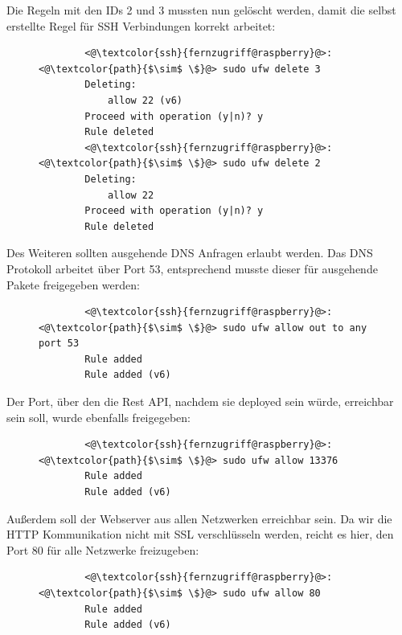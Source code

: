 \documentclass[a4paper, 11pt]{scrartcl}
\begin{document}
Die Regeln mit den IDs 2 und 3 mussten nun gelöscht werden, damit die selbst erstellte Regel für SSH Verbindungen korrekt arbeitet:
\begin{figure}[H]
    \begin{mdframed}[backgroundcolor=bbg]
        \begin{lstlisting}
        <@\textcolor{ssh}{fernzugriff@raspberry}@>:<@\textcolor{path}{$\sim$ \$}@> sudo ufw delete 3
        Deleting:
            allow 22 (v6)
        Proceed with operation (y|n)? y
        Rule deleted
        <@\textcolor{ssh}{fernzugriff@raspberry}@>:<@\textcolor{path}{$\sim$ \$}@> sudo ufw delete 2
        Deleting:
            allow 22
        Proceed with operation (y|n)? y
        Rule deleted
        \end{lstlisting}
    \end{mdframed}
    \label{lst:firewall_delete_standard}
\end{figure}
Des Weiteren sollten ausgehende DNS Anfragen erlaubt werden. Das DNS Protokoll arbeitet über Port 53, entsprechend musste dieser für ausgehende
Pakete freigegeben werden:
\begin{figure}[H]
    \begin{mdframed}[backgroundcolor=bbg]
        \begin{lstlisting}
        <@\textcolor{ssh}{fernzugriff@raspberry}@>:<@\textcolor{path}{$\sim$ \$}@> sudo ufw allow out to any port 53
        Rule added
        Rule added (v6)
        \end{lstlisting}
    \end{mdframed}
    \label{lst:firewall_allout_out_dns}
\end{figure}
Der Port, über den die Rest API, nachdem sie deployed sein würde, erreichbar sein soll, wurde ebenfalls freigegeben:
\begin{figure}[H]
    \begin{mdframed}[backgroundcolor=bbg]
        \begin{lstlisting}
        <@\textcolor{ssh}{fernzugriff@raspberry}@>:<@\textcolor{path}{$\sim$ \$}@> sudo ufw allow 13376
        Rule added
        Rule added (v6)
        \end{lstlisting}
    \end{mdframed}
    \label{lst:firewall_allow_api}
\end{figure}
Außerdem soll der Webserver aus allen Netzwerken erreichbar sein. Da wir die HTTP Kommunikation nicht mit SSL verschlüsseln werden, reicht es hier, den Port 80
für alle Netzwerke freizugeben:
\begin{figure}[H]
    \begin{mdframed}[backgroundcolor=bbg]
        \begin{lstlisting}
        <@\textcolor{ssh}{fernzugriff@raspberry}@>:<@\textcolor{path}{$\sim$ \$}@> sudo ufw allow 80
        Rule added
        Rule added (v6)
        \end{lstlisting}
    \end{mdframed}
    \label{lst:firewall_allow_http}
\end{figure}
\end{document}
